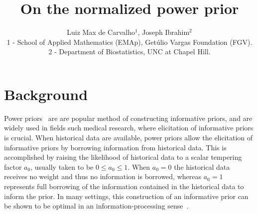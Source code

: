\documentclass[a4paper, notitlepage, 11pt]{article}
\title{\vspace{-9ex}\centering \bf On
the normalized power prior}
\author{
Luiz Max de Carvalho$^1$, Joseph Ibrahim$^2$\\
1 - School of Applied Mathematics (EMAp), Get\'ulio Vargas Foundation (FGV).\\
2 - Department of Biostatistics, UNC at Chapel Hill.\\
}
\begin{document}
\maketitle

% 

\section{Background}

Power priors~\citep{Ibrahim2000,Ibrahim2015} are are popular method of constructing informative priors, and are widely used in fields such medical research, where elicitation of informative priors is crucial.
When historical data are available, power priors allow the elicitation of informative priors by borrowing information from historical data.
This is accomplished by raising the likelihood of historical data to a scalar tempering factor $a_0$, usually taken to be $0 \leq a_0 \leq 1$.
When $a_0 = 0$ the historical data receives no weight and thus no information is borrowed, whereas $a_0 = 1$ represents full borrowing of the information contained in the historical data to inform the prior.
In many settings, this construction of an informative prior can be shown to be optimal in an information-processing sense~\citep{Zellner2002,Ibrahim2003}.
\end{document}
